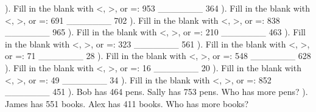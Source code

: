 \documentclass{article}%
\begin{document}
). Fill in the blank with <, >, or =: 953 \_\_\_\_\_\_\_ 364%
\newline%
\newline%
). Fill in the blank with <, >, or =: 691 \_\_\_\_\_\_\_ 702%
\newline%
\newline%
). Fill in the blank with <, >, or =: 838 \_\_\_\_\_\_\_ 965%
\newline%
\newline%
). Fill in the blank with <, >, or =: 210 \_\_\_\_\_\_\_ 463%
\newline%
\newline%
). Fill in the blank with <, >, or =: 323 \_\_\_\_\_\_\_ 561%
\newline%
\newline%
). Fill in the blank with <, >, or =: 71 \_\_\_\_\_\_\_ 28%
\newline%
\newline%
). Fill in the blank with <, >, or =: 548 \_\_\_\_\_\_\_ 628%
\newline%
\newline%
). Fill in the blank with <, >, or =: 16 \_\_\_\_\_\_\_ 20%
\newline%
\newline%
). Fill in the blank with <, >, or =: 49 \_\_\_\_\_\_\_ 34%
\newline%
\newline%
). Fill in the blank with <, >, or =: 852 \_\_\_\_\_\_\_ 451%
\newline%
\newline%
). Bob has 464 pens. Sally has 753 pens. Who has more pens?%
\newline%
\newline%
). James has 551 books. Alex has 411 books. Who has more books?%
\newline%
\newline%
\newline%
\end{document}
